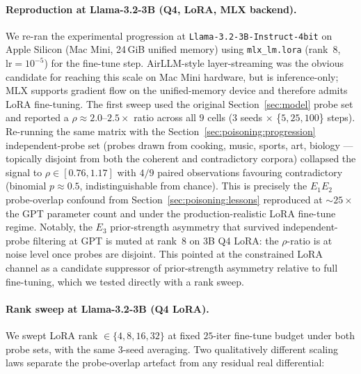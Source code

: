 \documentclass[11pt,a4paper]{article}
\begin{document}
\paragraph{Reproduction at Llama-3.2-3B (Q4, LoRA, MLX backend).}
We re\nobreakdash-ran the experimental progression at
\texttt{Llama-3.2-3B-Instruct-4bit} on Apple Silicon (Mac Mini,
\num{24}\,GiB unified memory) using \texttt{mlx\_lm.lora}
(rank~$8$, $\mathrm{lr}=10^{-5}$) for the fine\nobreakdash-tune
step.  AirLLM-style layer\nobreakdash-streaming was the obvious
candidate for reaching this scale on Mac Mini hardware, but is
inference\nobreakdash-only; MLX supports gradient flow on the
unified\nobreakdash-memory device and therefore admits LoRA
fine\nobreakdash-tuning.  The first sweep used the original
Section~\ref{sec:model} probe set and reported a
$\rho \approx 2.0\text{--}2.5\!\times$ ratio across all $9$ cells
($3$ seeds $\times$ \{$5, 25, 100$\} steps).  Re\nobreakdash-running
the same matrix with the Section~\ref{sec:poisoning:progression}
independent\nobreakdash-probe set (probes drawn from cooking,
music, sports, art, biology — topically disjoint from both the
coherent and contradictory corpora) collapsed the signal to
$\rho \in [0.76, 1.17]$ with $4/9$ paired observations favouring
contradictory (binomial $p \approx 0.5$, indistinguishable from
chance).  This is precisely the $E_1$\textendash$E_2$
probe\nobreakdash-overlap confound from
Section~\ref{sec:poisoning:lessons} reproduced at
$\sim\!25\!\times$ the GPT parameter count and
under the production\nobreakdash-realistic LoRA fine\nobreakdash-tune
regime.  Notably, the $E_3$ prior\nobreakdash-strength asymmetry
that survived independent\nobreakdash-probe filtering at
GPT is muted at rank~$8$ on 3B Q4 LoRA: the
$\rho$\nobreakdash-ratio is at noise level once probes are
disjoint.  This pointed at the constrained LoRA channel as a
candidate suppressor of prior\nobreakdash-strength asymmetry
relative to full fine\nobreakdash-tuning, which we tested directly
with a rank sweep.

\paragraph{Rank sweep at Llama-3.2-3B (Q4 LoRA).}
We swept LoRA rank $\in \{4, 8, 16, 32\}$ at fixed
$25$\nobreakdash-iter fine\nobreakdash-tune budget under both
probe sets, with the same $3$\nobreakdash-seed averaging.  Two
qualitatively different scaling laws separate the
probe\nobreakdash-overlap artefact from any residual real
differential:
\end{document}

